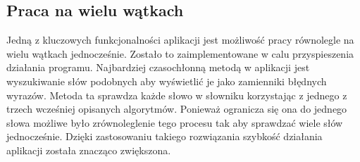 \subsection{Praca na wielu wątkach}

Jedną z kluczowych funkcjonalności aplikacji jest możliwość pracy równolegle na wielu wątkach jednocześnie. Zostało to zaimplementowane w calu przyspieszenia działania programu. Najbardziej czasochłonną metodą w aplikacji jest wyszukiwanie słów podobnych aby wyświetlić je jako zamienniki błędnych wyrazów. Metoda ta sprawdza każde słowo w słowniku korzystając z jednego z trzech wcześniej opisanych algorytmów. Ponieważ ogranicza się ona do jednego słowa możliwe było zrównoleglenie tego procesu tak aby sprawdzać wiele słów jednocześnie. Dzięki zastosowaniu takiego rozwiązania szybkość działania aplikacji została znacząco zwiększona.


